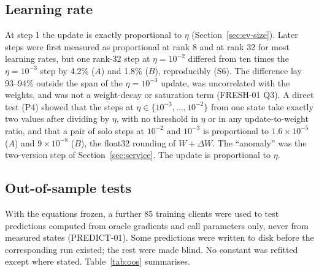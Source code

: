 \documentclass[11pt]{article}
\begin{document}
\subsection{Learning rate}\label{sec:ev-lr}
At step 1 the update is exactly proportional to $\eta$ (Section~\ref{sec:ev-size}). Later steps
were first measured as proportional at rank 8 and at rank 32 for most learning rates, but one rank-32
step at $\eta=10^{-2}$ differed from ten times the $\eta=10^{-3}$ step by 4.2\% ($A$) and 1.8\% ($B$),
reproducibly (S6). The difference lay 93--94\% outside the span of the $\eta=10^{-3}$ update, was
uncorrelated with the weights, and was not a weight-decay or saturation term (FRESH-01 Q3). A direct
test (P4) showed that the steps at $\eta\in\{10^{-3},\dots,10^{-2}\}$ from one state take exactly two
values after dividing by $\eta$, with no threshold in $\eta$ or in any update-to-weight ratio, and that
a pair of solo steps at $10^{-2}$ and $10^{-3}$ is proportional to $1.6\times10^{-5}$ ($A$) and
$9\times10^{-8}$ ($B$), the float32 rounding of $W+\Delta W$. The ``anomaly'' was the two-version step
of Section~\ref{sec:service}. The update is proportional to $\eta$.

\subsection{Out-of-sample tests}\label{sec:ev-oos}
With the equations frozen, a further 85 training clients were used to test predictions computed from
oracle gradients and call parameters only, never from measured states (PREDICT-01). Some predictions
were written to disk before the corresponding run existed; the rest were made blind. No constant was
refitted except where stated. Table~\ref{tab:oos} summarises.
\end{document}
